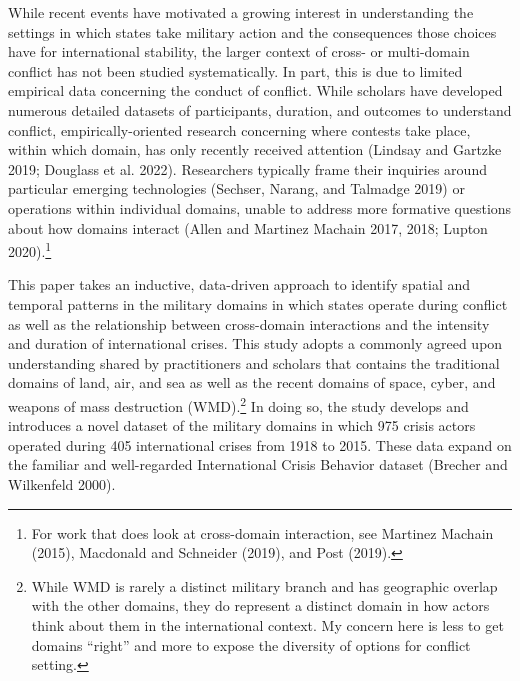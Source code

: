 \documentclass[
]{article}
\begin{document}
While recent events have motivated a growing interest in understanding the settings in which states take military action and the consequences those choices have for international stability, the larger context of cross- or multi-domain conflict has not been studied systematically. In part, this is due to limited empirical data concerning the conduct of conflict. While scholars have developed numerous detailed datasets of participants, duration, and outcomes to understand conflict, empirically-oriented research concerning where contests take place, within which domain, has only recently received attention (Lindsay and Gartzke 2019; Douglass et al. 2022). Researchers typically frame their inquiries around particular emerging technologies (Sechser, Narang, and Talmadge 2019) or operations within individual domains, unable to address more formative questions about how domains interact (Allen and Martinez Machain 2017, 2018; Lupton 2020).\footnote{For work that does look at cross-domain interaction, see Martinez Machain (2015), Macdonald and Schneider (2019), and Post (2019).}

This paper takes an inductive, data-driven approach to identify spatial and temporal patterns in the military domains in which states operate during conflict as well as the relationship between cross-domain interactions and the intensity and duration of international crises. This study adopts a commonly agreed upon understanding shared by practitioners and scholars that contains the traditional domains of land, air, and sea as well as the recent domains of space, cyber, and weapons of mass destruction (WMD).\footnote{While WMD is rarely a distinct military branch and has geographic overlap with the other domains, they do represent a distinct domain in how actors think about them in the international context. My concern here is less to get domains ``right'' and more to expose the diversity of options for conflict setting.} In doing so, the study develops and introduces a novel dataset of the military domains in which 975 crisis actors operated during 405 international crises from 1918 to 2015. These data expand on the familiar and well-regarded International Crisis Behavior dataset (Brecher and Wilkenfeld 2000).
\end{document}
